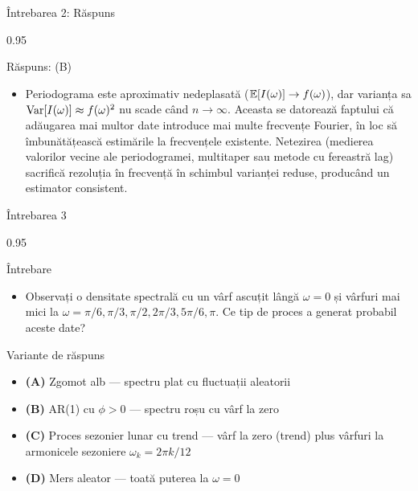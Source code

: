 \documentclass[9pt, aspectratio=169, t]{beamer}
\begin{document}
\begin{frame}{Întrebarea 2: Răspuns}
    \begin{cminipage}{0.95\textwidth}
    \vspace{-0.3cm}
    {\small
    \begin{exampleblock}{Răspuns: (B)}
    \begin{itemize}\setlength{\itemsep}{0pt}
        \item Periodograma este aproximativ nedeplasată ($\mathbb{E}[I(\omega)] \to f(\omega)$), dar varianța sa $\text{Var}[I(\omega)] \approx f(\omega)^2$ nu scade când $n \to \infty$. Aceasta se datorează faptului că adăugarea mai multor date introduce mai multe frecvențe Fourier, în loc să îmbunătățească estimările la frecvențele existente. Netezirea (medierea valorilor vecine ale periodogramei, multitaper sau metode cu fereastră lag) sacrifică rezoluția în frecvență în schimbul varianței reduse, producând un estimator consistent.
    \end{itemize}
    \end{exampleblock}
    }
    \hfill{}
    \end{cminipage}
\end{frame}

\begin{frame}{Întrebarea 3}
    \begin{cminipage}{0.95\textwidth}
    \begin{alertblock}{Întrebare}
        \begin{itemize}\setlength{\itemsep}{0pt}
            \item Observați o densitate spectrală cu un vârf ascuțit lângă $\omega = 0$ și vârfuri mai mici la $\omega = \pi/6, \pi/3, \pi/2, 2\pi/3, 5\pi/6, \pi$. Ce tip de proces a generat probabil aceste date?
        \end{itemize}
    \end{alertblock}

    \vspace{0.3cm}

    \begin{block}{Variante de răspuns}
        \begin{itemize}\setlength{\itemsep}{2pt}
            \item \textcolor{MainBlue}{\textbf{(A)}} Zgomot alb --- spectru plat cu fluctuații aleatorii
            \item \textcolor{MainBlue}{\textbf{(B)}} AR(1) cu $\phi > 0$ --- spectru roșu cu vârf la zero
            \item \textcolor{MainBlue}{\textbf{(C)}} Proces sezonier lunar cu trend --- vârf la zero (trend) plus vârfuri la armonicele sezoniere $\omega_k = 2\pi k/12$
            \item \textcolor{MainBlue}{\textbf{(D)}} Mers aleator --- toată puterea la $\omega = 0$
        \end{itemize}
    \end{block}
    \end{cminipage}
\end{frame}
\end{document}
